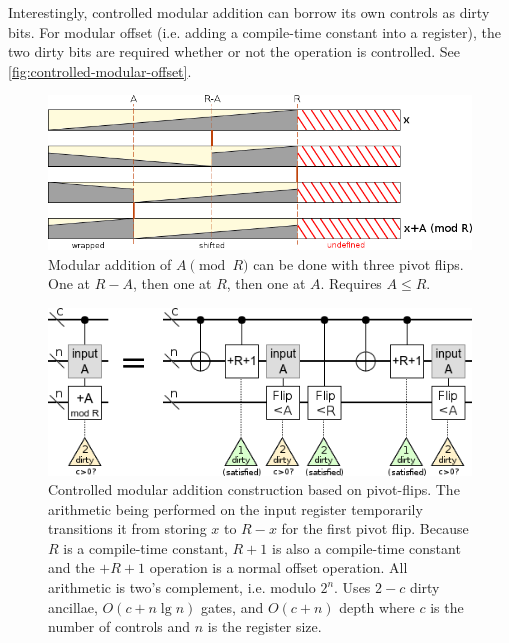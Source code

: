 \documentclass[twocolumn,longbibliography]{quantumarticle-customized}
\begin{document}
Interestingly, controlled modular addition can borrow its own controls as dirty bits.
For modular offset (i.e. adding a compile-time constant into a register), the two dirty bits are required whether or not the operation is controlled.
See \autoref{fig:controlled-modular-offset}.

\begin{figure}
  \centering
  \includegraphics[width=\linewidth]{assets/mod-add-from-pivot-flip-bars.png}
  \caption{
     Modular addition of $A \pmod{R}$ can be done with three pivot flips.
     One at $R-A$, then one at $R$, then one at $A$.
     Requires $A \leq R$.
   }
  \label{fig:mod-add-from-pivot-flip-bars}
\end{figure}

\begin{figure}
  \centering
  \includegraphics[width=\linewidth]{assets/controlled-modular-addition.png}
  \caption{
    Controlled modular addition construction based on pivot-flips.
    The arithmetic being performed on the input register temporarily transitions it from storing $x$ to $R-x$ for the first pivot flip.
    Because $R$ is a compile-time constant, $R+1$ is also a compile-time constant and the $+R+1$ operation is a normal offset operation.
    All arithmetic is two's complement, i.e. modulo $2^n$.
    Uses $2-c$ dirty ancillae, $O(c + n \lg n)$ gates, and $O(c + n)$ depth where $c$ is the number of controls and $n$ is the register size.
  }
  \label{fig:controlled-modular-add}
\end{figure}
\end{document}
